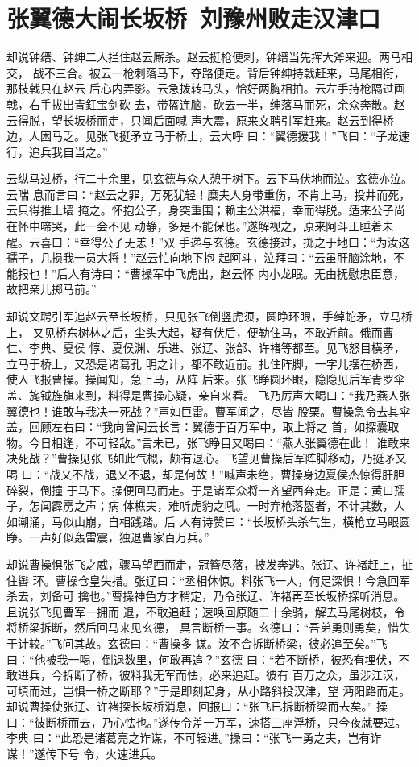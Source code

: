 \chapter{张翼德大闹长坂桥~刘豫州败走汉津口}

却说钟缙、钟绅二人拦住赵云厮杀。赵云挺枪便刺，钟缙当先挥大斧来迎。两马相交，
战不三合。被云一枪刺落马下，夺路便走。背后钟绅持戟赶来，马尾相衔，那枝戟只在赵云
后心内弄影。云急拨转马头，恰好两胸相拍。云左手持枪隔过画戟，右手拔出青釭宝剑砍
去，带盔连脑，砍去一半，绅落马而死，余众奔散。赵云得脱，望长坂桥而走，只闻后面喊
声大震，原来文聘引军赶来。赵云到得桥边，人困马乏。见张飞挺矛立马于桥上，云大呼
曰：“翼德援我！”飞曰：“子龙速行，追兵我自当之。”

云纵马过桥，行二十余里，见玄德与众人憩于树下。云下马伏地而泣。玄德亦泣。云喘
息而言曰：“赵云之罪，万死犹轻！糜夫人身带重伤，不肯上马，投井而死，云只得推土墙
掩之。怀抱公子，身突重围；赖主公洪福，幸而得脱。适来公子尚在怀中啼哭，此一会不见
动静，多是不能保也。”遂解视之，原来阿斗正睡着未醒。云喜曰：“幸得公子无恙！”双
手递与玄德。玄德接过，掷之于地曰：“为汝这孺子，几损我一员大将！”赵云忙向地下抱
起阿斗，泣拜曰：“云虽肝脑涂地，不能报也！”后人有诗曰：“曹操军中飞虎出，赵云怀
内小龙眠。无由抚慰忠臣意，故把亲儿掷马前。”

却说文聘引军追赵云至长坂桥，只见张飞倒竖虎须，圆睁环眼，手绰蛇矛，立马桥上，
又见桥东树林之后，尘头大起，疑有伏后，便勒住马，不敢近前。俄而曹仁、李典、夏侯
惇、夏侯渊、乐进、张辽、张郃、许褚等都至。见飞怒目横矛，立马于桥上，又恐是诸葛孔
明之计，都不敢近前。扎住阵脚，一字儿摆在桥西，使人飞报曹操。操闻知，急上马，从阵
后来。张飞睁圆环眼，隐隐见后军青罗伞盖、旄钺旌旗来到，料得是曹操心疑，亲自来看。
飞乃厉声大喝曰：“我乃燕人张翼德也！谁敢与我决一死战？”声如巨雷。曹军闻之，尽皆
股栗。曹操急令去其伞盖，回顾左右曰：“我向曾闻云长言：翼德于百万军中，取上将之
首，如探囊取物。今日相逢，不可轻敌。”言未已，张飞睁目又喝曰：“燕人张翼德在此！
谁敢来决死战？”曹操见张飞如此气概，颇有退心。飞望见曹操后军阵脚移动，乃挺矛又喝
曰：“战又不战，退又不退，却是何故！”喊声未绝，曹操身边夏侯杰惊得肝胆碎裂，倒撞
于马下。操便回马而走。于是诸军众将一齐望西奔走。正是：黄口孺子，怎闻霹雳之声；病
体樵夫，难听虎豹之吼。一时弃枪落盔者，不计其数，人如潮涌，马似山崩，自相践踏。后
人有诗赞曰：“长坂桥头杀气生，横枪立马眼圆睁。一声好似轰雷震，独退曹家百万兵。”

却说曹操惧张飞之威，骤马望西而走，冠簪尽落，披发奔逃。张辽、许褚赶上，扯住辔
环。曹操仓皇失措。张辽曰：“丞相休惊。料张飞一人，何足深惧！今急回军杀去，刘备可
擒也。”曹操神色方才稍定，乃令张辽、许褚再至长坂桥探听消息。且说张飞见曹军一拥而
退，不敢追赶；速唤回原随二十余骑，解去马尾树枝，令将桥梁拆断，然后回马来见玄德，
具言断桥一事。玄德曰：“吾弟勇则勇矣，惜失于计较。”飞问其故。玄德曰：“曹操多
谋。汝不合拆断桥梁，彼必追至矣。”飞曰：“他被我一喝，倒退数里，何敢再追？”玄德
曰：“若不断桥，彼恐有埋伏，不敢进兵，今拆断了桥，彼料我无军而怯，必来追赶。彼有
百万之众，虽涉江汉，可填而过，岂惧一桥之断耶？”于是即刻起身，从小路斜投汉津，望
沔阳路而走。却说曹操使张辽、许褚探长坂桥消息，回报曰：“张飞已拆断桥梁而去矣。”
操曰：“彼断桥而去，乃心怯也。”遂传令差一万军，速搭三座浮桥，只今夜就要过。李典
曰：“此恐是诸葛亮之诈谋，不可轻进。”操曰：“张飞一勇之夫，岂有诈谋！”遂传下号
令，火速进兵。

